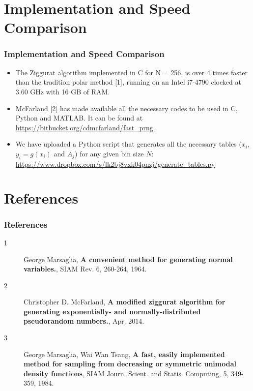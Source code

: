 \documentclass{beamer}
\begin{document}
\section{Implementation and Speed Comparison}
\begin{frame}
\frametitle{Implementation and Speed Comparison}
	\begin{itemize}
		\item The Ziggurat algorithm implemented in C for N = 256, is over 4 times
faster than the tradition polar method [1], running on an Intel i7-4790 clocked at 3.60 GHz with 16
GB of RAM.
		\item McFarland [2] has made available all the necessary codes to be used in C, Python and MATLAB. It can be found at \url{https://bitbucket.org/cdmcfarland/fast_prng}.
		\item We have uploaded a Python script that generates all the necessary tables ($x_i$, $y_i=g(x_i)$ and $A_j$) for any given bin size $N$: \url{https://www.dropbox.com/s/lk2bj8vxk04pnzj/generate_tables.py}
	\end{itemize}
\end{frame}

\section{References}
	
\begin{frame}
\frametitle{References}
\begin{description}
\item[1] George Marsaglia, \textbf{A convenient method for generating normal variables.}, SIAM Rev. 6, 260-264, 1964.
\item[2] Christopher D. McFarland, \textbf{A modified ziggurat algorithm for generating exponentially- and normally-distributed pseudorandom numbers.}, Apr. 2014.
\item[3] George Marsaglia, Wai Wan Tsang, \textbf{A fast, easily implemented method for sampling from decreasing or symmetric unimodal density functions}, SIAM Journ. Scient. and Statis. Computing, 5, 349-359, 1984.
\end{description}
\end{frame}
\end{document}
